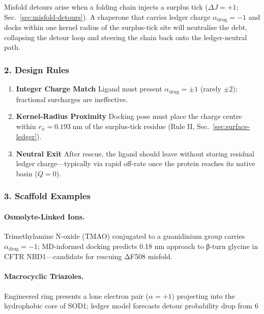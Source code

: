 \documentclass[11pt,oneside]{book}
\begin{document}
Misfold detours arise when a folding chain injects a surplus tick
(\(\Delta J = +1\); Sec.~\ref{sec:misfold-detours}).  
A chaperone that carries ledger charge \(\alpha_{\text{drug}} = -1\)
and docks within one kernel radius of the surplus-tick site will
neutralise the debt, collapsing the detour loop and steering the chain
back onto the ledger-neutral path.

\subsubsection*{2. Design Rules}

\begin{enumerate}[label=\textbf{\arabic*.}, leftmargin=1.2cm]
\item \textbf{Integer Charge Match}  
      Ligand must present \(\alpha_{\text{drug}} = \pm1\) (rarely \(\pm2\));
      fractional surcharges are ineffective.
\item \textbf{Kernel-Radius Proximity}  
      Docking pose must place the charge centre within
      \(r_\phi = 0.193\;\text{nm}\) of the surplus-tick residue
      (Rule II, Sec.~\ref{sec:surface-ledger}).
\item \textbf{Neutral Exit}  
      After rescue, the ligand should leave without storing residual
      ledger charge—typically via rapid off-rate once the protein reaches
      its native basin (\(Q=0\)).
\end{enumerate}

\subsubsection*{3. Scaffold Examples}

\paragraph{Osmolyte-Linked Ions.}  
Trimethylamine N-oxide (TMAO) conjugated to a guanidinium group
carries \(\alpha_{\text{drug}} = -1\); MD-informed docking predicts
0.18 nm approach to β-turn glycine in CFTR NBD1—candidate for rescuing
ΔF508 misfold.

\paragraph{Macrocyclic Triazoles.}  
Engineered ring presents a lone electron pair (\(\alpha = +1\)) projecting
into the hydrophobic core of SOD1; ledger model forecasts detour
probability drop from 6 %
\end{document}
